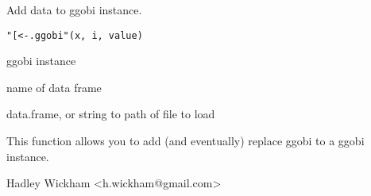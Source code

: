 \HeaderA{"[<-.ggobi"}{[<-.ggobi}{"[<.Rdash..ggobi"}
\aliasA{\$<\Rdash.ggobi}{"[<-.ggobi"}{.Rdol.<.Rdash..ggobi}
\aliasA{[<\Rdash.ggobi}{"[<-.ggobi"}{[<.Rdash..ggobi}
\keyword{manip}{"[<-.ggobi"}
\begin{Description}\relax
Add data to ggobi instance.
\end{Description}
\begin{Usage}
\begin{verbatim}"[<-.ggobi"(x, i, value)\end{verbatim}
\end{Usage}
\begin{Arguments}
\begin{ldescription}
\item[\code{x}] ggobi instance
\item[\code{i}] name of data frame
\item[\code{value}] data.frame, or string to path of file to load
\end{ldescription}
\end{Arguments}
\begin{Details}\relax
This function allows you to add (and eventually) replace
ggobi to a ggobi instance.
\end{Details}
\begin{Author}\relax
Hadley Wickham <h.wickham@gmail.com>
\end{Author}
\begin{Examples}
\end{Examples}

